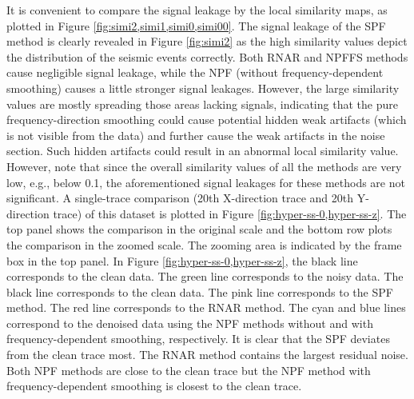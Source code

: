 It is convenient to compare the signal leakage by the local similarity maps, as plotted in Figure \ref{fig:simi2,simi1,simi0,simi00}. The signal leakage of the SPF method is clearly revealed in Figure \ref{fig:simi2} as the high similarity values depict the distribution of the seismic events correctly. Both RNAR and NPFFS methods cause negligible signal leakage, while the NPF (without frequency-dependent smoothing) causes a little stronger signal leakages. However, the large similarity values are mostly spreading those areas lacking signals, indicating that the pure frequency-direction smoothing could cause potential hidden weak artifacts (which is not visible from the data) and further cause the weak artifacts in the noise section. Such hidden artifacts could result in an abnormal local similarity value. However, note that since the overall similarity values of all the methods are very low, e.g., below 0.1, the aforementioned signal leakages for these methods are not significant. A single-trace comparison (20th X-direction trace and 20th Y-direction trace) of this dataset is plotted in Figure \ref{fig:hyper-ss-0,hyper-ss-z}. The top panel shows the comparison in the original scale and the bottom row plots the comparison in the zoomed scale. The zooming area is indicated by the frame box in the top panel. In Figure \ref{fig:hyper-ss-0,hyper-ss-z}, the black line corresponds to the clean data. The green line corresponds to the noisy data. The black line corresponds to the clean data. The pink line corresponds to the SPF method. The red line corresponds to the RNAR method.  The cyan and blue lines correspond to the denoised data using the NPF methods without and with  frequency-dependent smoothing, respectively. It is clear that the SPF deviates from the clean trace most. The RNAR method contains the largest residual noise. Both NPF methods are close to the clean trace but the NPF method with frequency-dependent smoothing is closest to the clean trace.


